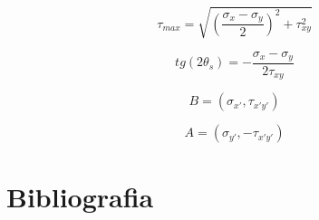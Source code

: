 \documentclass[a4paper]{article}
\begin{document}
\begin{equation}
	\tau_{max} = \sqrt{(\frac{\sigma_x - \sigma_y}{2})^2 + \tau_{xy}^2}
\end{equation}

\begin{equation}
	tg(2\theta_s) = - \frac{\sigma_x - \sigma_y}{2\tau_{xy}}
\end{equation}

\begin{equation}
	B = (\sigma_{x'}, \tau_{x'y'})
\end{equation}

\begin{equation}
	A = (\sigma_{y'}, -\tau_{x'y'})
\end{equation}


\section{Bibliografia}


\end{document}
